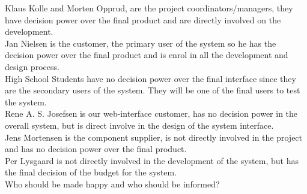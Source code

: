 Klaus Kolle and Morten Opprud, are the project coordinators/managers, they
have decision power over the final product and are directly involved on the
development.\\

Jan Nielsen is the customer, the primary user of the system so he has the
decision power over the final product and is enrol in all the development and design process.\\

High School Students have no decision power over the final interface since they
are the secondary users of the system. They will be one of the final users to test the system.\\

Rene A. S. Josefsen is our web-interface customer, has no decision power in the
overall system, but is direct involve in the design of the system interface.\\

Jens Mortensen is the component supplier, is not directly involved in the
project and has no decision power over the final product.\\

Per Lysgaard is not directly involved in the development of the system, but has the final decision of the budget for the system.\\

{\Huge Who should be made happy and who should be informed?}

